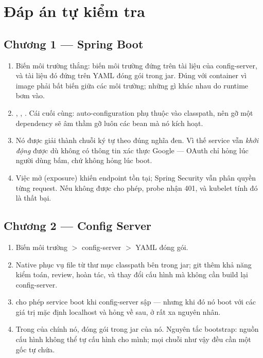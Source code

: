\chapter{Đáp án tự kiểm tra}
\label{app:answers}

\section*{Chương 1 --- Spring Boot}
\begin{enumerate}
  \item Biến môi trường thắng: biến môi trường đứng trên tài liệu của
  config-server, và tài liệu đó đứng trên YAML đóng gói trong jar. Đúng
  với container vì image phải bất biến giữa các môi trường; những gì
  khác nhau do runtime bơm vào.
  \item {}, ,
  . Cái cuối cùng: auto-configuration
  phụ thuộc vào classpath, nên gỡ một dependency sẽ âm thầm gỡ luôn các
  bean mà nó kích hoạt.
  \item Nó được giải thành chuỗi ký tự  theo đúng
  nghĩa đen. Vì thế service vẫn \emph{khởi động} được dù không có
  thông tin xác thực Google --- OAuth chỉ hỏng lúc người dùng bấm, chứ
  không hỏng lúc boot.
  \item Việc mở (exposure) khiến endpoint tồn tại; Spring Security vẫn
  phân quyền từng request. Nếu  không được cho phép,
  probe nhận 401, và kubelet tính đó là thất bại.
\end{enumerate}

\section*{Chương 2 --- Config Server}
\begin{enumerate}
  \item Biến môi trường $>$ config-server $>$ YAML đóng gói.
  \item Native phục vụ file từ thư mục classpath bên trong jar; git
  thêm khả năng kiểm toán, review, hoàn tác, và thay đổi cấu hình mà
  không cần build lại config-server.
  \item {} cho phép service boot khi config-server sập
  --- nhưng khi đó nó boot với các giá trị mặc định localhost và hỏng
  về sau, ở rất xa nguyên nhân.
  \item Trong  của chính nó, đóng gói trong jar
  của nó. Nguyên tắc bootstrap: nguồn cấu hình không thể tự cấu hình
  cho mình; mọi chuỗi như vậy đều cần một gốc tự chứa.
\end{enumerate}

